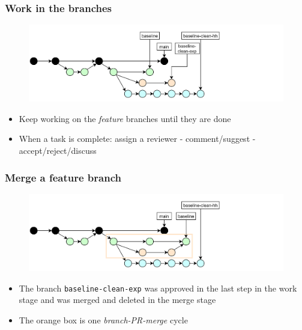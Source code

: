 \documentclass[aspectratio=169]{beamer} %
\begin{document}
\begin{frame}
	\frametitle{Work in the branches}

	\vspace{-.5cm}
	\begin{minipage}[t][5cm][t]{\textwidth}
		\begin{figure}
			\centering
			\includegraphics[width=\textwidth]{./img/dime-gitflow-network-2-3.png}
		\end{figure}
	\end{minipage}

	\vspace{-.5cm}
	\begin{minipage}[t][5cm][t]{\textwidth}
		\begin{itemize}
			\setlength\itemsep{.5em}
			\item Keep working on the \textit{feature} branches until
			they are done
			\item When a task is complete: assign a reviewer
			- comment/suggest - accept/reject/discuss
		\end{itemize}
	\end{minipage}
\end{frame}

\begin{frame}
	\frametitle{Merge a feature branch}

	\vspace{-.5cm}
	\begin{minipage}[t][5cm][t]{\textwidth}
		\begin{figure}
			\centering
			\includegraphics[width=\textwidth]{./img/dime-gitflow-network-2-4.png}
		\end{figure}
	\end{minipage}

	\vspace{-.5cm}
	\begin{minipage}[t][5cm][t]{\textwidth}
		\begin{itemize}
			\setlength\itemsep{.5em}
			\item The branch \texttt{baseline-clean-exp} was
			approved in the last step in the work stage and
			was merged and deleted in the merge stage
			\item The orange box is one \textit{branch-PR-merge} cycle
		\end{itemize}
	\end{minipage}
\end{frame}
\end{document}
